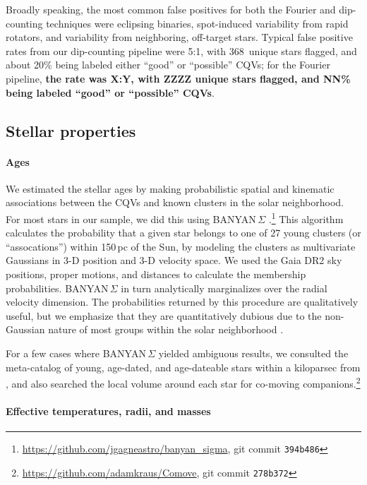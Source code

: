 \documentclass[11pt,twocolumn,tighten]{aastex63}
\newcommand{\nuniqdipflagged}{{368}} %
\begin{document}
Broadly speaking, the most common false positives for both the Fourier
and dip-counting techniques were eclipsing binaries, spot-induced
variability from rapid rotators, and variability from neighboring,
off-target stars.  Typical false positive rates from our dip-counting
pipeline were 5:1, with \nuniqdipflagged\ unique stars flagged, and
about 20\% being labeled either ``good'' or ``possible'' CQVs; for
the Fourier pipeline, {\bf the rate was X:Y, with ZZZZ unique stars
flagged, and NN\% being labeled ``good'' or ``possible'' CQVs}.


\subsection{Stellar properties}
\label{subsec:starprops}

\paragraph{Ages}
We estimated the stellar ages by making probabilistic spatial and
kinematic associations between the CQVs and known clusters in the
solar neighborhood.  For most stars in our sample, we did this using
BANYAN\,$\Sigma$
\citep{2018ApJ...856...23G}.\footnote{\url{https://github.com/jgagneastro/banyan_sigma},
git commit \texttt{394b486}} This algorithm calculates the probability
that a given star belongs to one of 27 young clusters (or
``assocations'') within 150\,pc of the Sun, by modeling the clusters
as multivariate Gaussians in 3-D position and 3-D velocity space.  We
used the Gaia DR2 sky positions, proper motions, and distances to
calculate the membership probabilities.  BANYAN\,$\Sigma$ in turn
analytically marginalizes over the radial velocity dimension.  The
probabilities returned by this procedure are qualitatively useful, but
we emphasize that they are quantitatively dubious due to the
non-Gaussian nature of most groups within the solar neighborhood
\citep[see e.g.][Figure~10]{2021ApJ...917...23K}.

For a few cases where BANYAN\,$\Sigma$ yielded ambiguous results, we
consulted the meta-catalog of young, age-dated, and age-dateable stars
within a kiloparsec from \citet{2022AJ....163..121B}, and also
searched the local volume around each star for co-moving
companions.\footnote{\url{https://github.com/adamkraus/Comove}, git
commit \texttt{278b372}}


\paragraph{Effective temperatures, radii, and masses}
\end{document}
